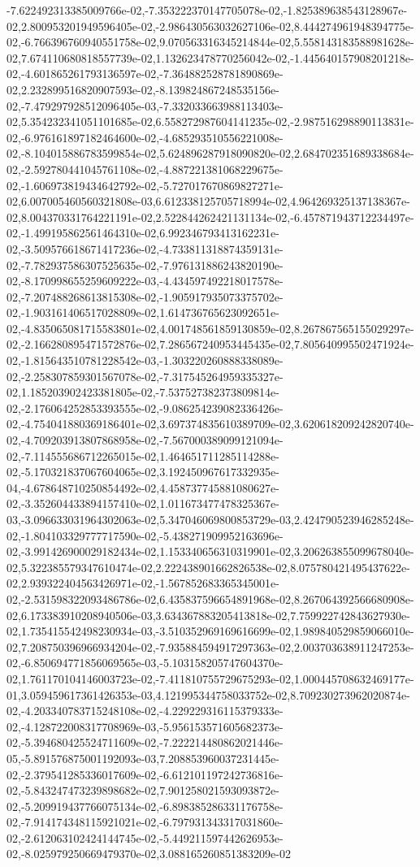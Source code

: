 -7.622492313385009766e-02,-7.353222370147705078e-02,-1.825389638543128967e-02,2.800953201949596405e-02,-2.986430563032627106e-02,8.444274961948394775e-02,-6.766396760940551758e-02,9.070563316345214844e-02,5.558143183588981628e-02,7.674110680818557739e-02,1.132623478770256042e-02,-1.445640157908201218e-02,-4.601865261793136597e-02,-7.364882528781890869e-02,2.232899516820907593e-02,-8.139824867248535156e-02,-7.479297928512096405e-03,-7.332033663988113403e-02,5.354232341051101685e-02,6.558272987604141235e-02,-2.987516298890113831e-02,-6.976161897182464600e-02,-4.685293510556221008e-02,-8.104015886783599854e-02,5.624896287918090820e-02,2.684702351689338684e-02,-2.592780441045761108e-02,-4.887221381068229675e-02,-1.606973819434642792e-02,-5.727017670869827271e-02,6.007005460560321808e-03,6.612338125705718994e-02,4.964269325137138367e-02,8.004370331764221191e-02,2.522844262421131134e-02,-6.457871943712234497e-02,-1.499195862561464310e-02,6.992346793413162231e-02,-3.509576618671417236e-02,-4.733811318874359131e-02,-7.782937586307525635e-02,-7.976131886243820190e-02,-8.170998655259609222e-03,-4.434597492218017578e-02,-7.207488268613815308e-02,-1.905917935073375702e-02,-1.903161406517028809e-02,1.614736765623092651e-02,-4.835065081715583801e-02,4.001748561859130859e-02,8.267867565155029297e-02,-2.166280895471572876e-02,7.286567240953445435e-02,7.805640995502471924e-02,-1.815643510781228542e-03,-1.303220260888338089e-02,-2.258307859301567078e-02,-7.317545264959335327e-02,1.185203902423381805e-02,-7.537527382373809814e-02,-2.176064252853393555e-02,-9.086254239082336426e-02,-4.754041880369186401e-02,3.697374835610389709e-02,3.620618209242820740e-02,-4.709203913807868958e-02,-7.567000389099121094e-02,-7.114555686712265015e-02,1.464651711285114288e-02,-5.170321837067604065e-02,3.192450967617332935e-04,-4.678648710250854492e-02,4.458737745881080627e-02,-3.352604433894157410e-02,1.011673477478325367e-03,-3.096633031964302063e-02,5.347046069800853729e-03,2.424790523946285248e-02,-1.804103329777717590e-02,-5.438271909952163696e-02,-3.991426900029182434e-02,1.153340656310319901e-02,3.206263855099678040e-02,5.322385579347610474e-02,2.222438901662826538e-02,8.075780421495437622e-02,2.939322404563426971e-02,-1.567852683365345001e-02,-2.531598322093486786e-02,6.435837596654891968e-02,8.267064392566680908e-02,6.173383910208940506e-03,3.634367883205413818e-02,7.759922742843627930e-02,1.735415542498230934e-03,-3.510352969169616699e-02,1.989840529859066010e-02,7.208750396966934204e-02,-7.935884594917297363e-02,2.003703638911247253e-02,-6.850694771856069565e-03,-5.103158205747604370e-02,1.761170104146003723e-02,-7.411810755729675293e-02,1.000445708632469177e-01,3.059459617361426353e-03,4.121995344758033752e-02,8.709230273962020874e-02,-4.203340783715248108e-02,-4.229229316115379333e-02,-4.128722008317708969e-03,-5.956153571605682373e-02,-5.394680425524711609e-02,-7.222214480862021446e-05,-5.891576875001192093e-03,7.208853960037231445e-02,-2.379541285336017609e-02,-6.612101197242736816e-02,-5.843247473239898682e-02,7.901258021593093872e-02,-5.209919437766075134e-02,-6.898385286331176758e-02,-7.914174348115921021e-02,-6.797931343317031860e-02,-2.612063102424144745e-02,-5.449211597442626953e-02,-8.025979250669479370e-02,3.088165260851383209e-02
